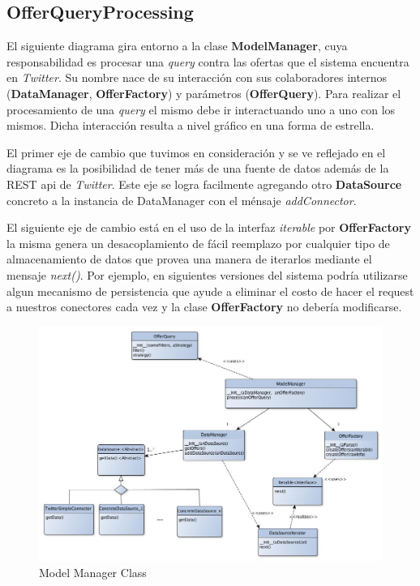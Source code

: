 \documentclass[10pt, a4paper]{article}
\begin{document}
\subsection{OfferQueryProcessing}
El siguiente diagrama gira entorno a la clase \textbf{ModelManager}, cuya responsabilidad es procesar una \emph{query} contra las ofertas que el sistema encuentra en \emph{Twitter}. Su nombre nace de su interacción con sus colaboradores internos (\textbf{DataManager}, \textbf{OfferFactory}) y parámetros (\textbf{OfferQuery}). Para realizar el procesamiento de una \emph{query} el mismo debe ir interactuando uno a uno con los mismos. Dicha interacción resulta a nivel gr\'afico en una forma de estrella.

El primer eje de cambio que tuvimos en consideración y se ve reflejado en el diagrama es la posibilidad de tener más de una fuente de datos adem\'as de la REST api de \emph{Twitter}. Este eje se logra facilmente agregando otro \textbf{DataSource} concreto a la instancia de  DataManager con el m\'ensaje \emph{addConnector}.

El siguiente eje de cambio est\'a en el uso de la interfaz \emph{iterable} por \textbf{OfferFactory} la misma genera un desacoplamiento de f\'acil reemplazo por cualquier tipo de almacenamiento de datos que provea una manera de iterarlos mediante el mensaje \emph{next()}. Por ejemplo, en siguientes versiones del sistema podría utilizarse algun mecanismo de persistencia que ayude a eliminar el costo de hacer el request a nuestros conectores cada vez y la clase \textbf{OfferFactory} no deber\'ia modificarse. 

\begin{figure}[H]
\centering
\includegraphics[scale=0.50]{graphics/model_manager_iterable_class.jpg}
\caption{Model Manager Class}
\end{figure}
\end{document}
